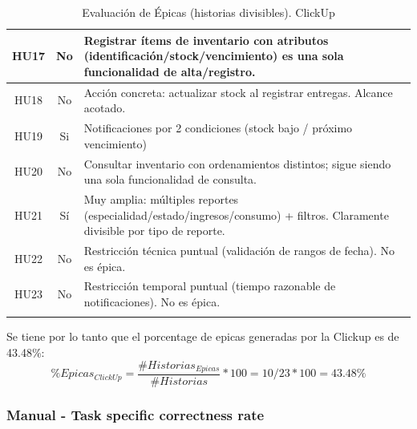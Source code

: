 \begin{longtable}{|c|c|p{6cm}|}
\hline
HU17 & No & Registrar ítems de inventario con atributos (identificación/stock/vencimiento) es una sola funcionalidad de alta/registro. \\
\hline
HU18 & No & Acción concreta: actualizar stock al registrar entregas. Alcance acotado. \\
\hline
HU19 & Si & Notificaciones por 2 condiciones (stock bajo / próximo vencimiento) \\
\hline
HU20 & No & Consultar inventario con ordenamientos distintos; sigue siendo una sola funcionalidad de consulta. \\
\hline
HU21 & Sí & Muy amplia: múltiples reportes (especialidad/estado/ingresos/consumo) + filtros. Claramente divisible por tipo de reporte. \\
\hline
HU22 & No & Restricción técnica puntual (validación de rangos de fecha). No es épica. \\
\hline
HU23 & No & Restricción temporal puntual (tiempo razonable de notificaciones). No es épica. \\
\hline
\caption{Evaluación de Épicas (historias divisibles). ClickUp}
\end{longtable}

Se tiene por lo tanto que el porcentage de epicas generadas por la Clickup es de 43.48\%:
\[
\% Epicas_{ClickUp} = \frac{\# Historias_{Epicas}} {\# Historias} * 100 = 10 / 23 * 100 = 43.48 \%  
\]

\subsubsection{Manual - Task specific correctness rate}


